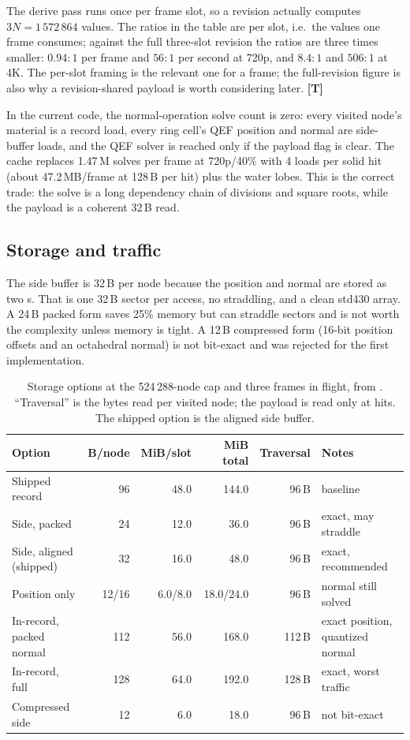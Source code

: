 \documentclass[11pt,a4paper]{article}
\newcommand{\evT}{\textsf{\textbf{\color{evT}[T]}}}
\DeclareRobustCommand{\fpath}[1]{\path{#1}}
\newcommand{\code}[1]{\texttt{\detokenize{#1}}}
\theoremstyle{plain}
\theoremstyle{definition}
\theoremstyle{remark}
\begin{document}
The derive pass runs once per frame slot, so a revision actually computes
$3N=1\,572\,864$ values. The ratios in the table are per slot, i.e.\ the
values one frame consumes; against the full three-slot revision the ratios are
three times smaller: $0.94{:}1$ per frame and $56{:}1$ per second at 720p, and
$8.4{:}1$ and $506{:}1$ at 4K. The per-slot framing is the relevant one for a
frame; the full-revision figure is also why a revision-shared payload is worth
considering later. \evT

In the current code, the normal-operation solve count is zero: every visited
node's material is a record load, every ring cell's QEF position and normal are
side-buffer loads, and the QEF solver is reached only if the payload flag is
clear. The cache replaces 1.47\,M solves per frame at 720p/40\% with 4 loads per
solid hit (about 47.2\,MB/frame at 128\,B per hit) plus the water lobes. This is
the correct trade: the solve is a long dependency chain of divisions and square
roots, while the payload is a coherent 32\,B read.

\subsection{Storage and traffic}

The side buffer is 32\,B per node because the position and normal are stored as
two \code{vec4}s. That is one 32\,B sector per access, no straddling, and a
clean std430 array. A 24\,B packed form saves 25\% memory but can straddle
sectors and is not worth the complexity unless memory is tight. A 12\,B
compressed form (16-bit position offsets and an octahedral normal) is not
bit-exact and was rejected for the first implementation.

\begin{table}[t]
\centering
\small
\caption{Storage options at the 524\,288-node cap and three frames in flight,
from \fpath{qef_gpu.tex}. ``Traversal'' is the bytes read per visited node; the
payload is read only at hits. The shipped option is the aligned side buffer.}
\label{tab:layouts}
\begin{tabularx}{\linewidth}{@{}lrrrrX@{}}
\toprule
Option & B/node & MiB/slot & MiB total & Traversal & Notes \\
\midrule
Shipped record & 96 & 48.0 & 144.0 & 96\,B & baseline \\
Side, packed & 24 & 12.0 & 36.0 & 96\,B & exact, may straddle \\
Side, aligned (shipped) & 32 & 16.0 & 48.0 & 96\,B & exact, recommended \\
Position only & 12/16 & 6.0/8.0 & 18.0/24.0 & 96\,B & normal still solved \\
In-record, packed normal & 112 & 56.0 & 168.0 & 112\,B & exact position, quantized normal \\
In-record, full & 128 & 64.0 & 192.0 & 128\,B & exact, worst traffic \\
Compressed side & 12 & 6.0 & 18.0 & 96\,B & not bit-exact \\
\bottomrule
\end{tabularx}
\end{table}
\end{document}
